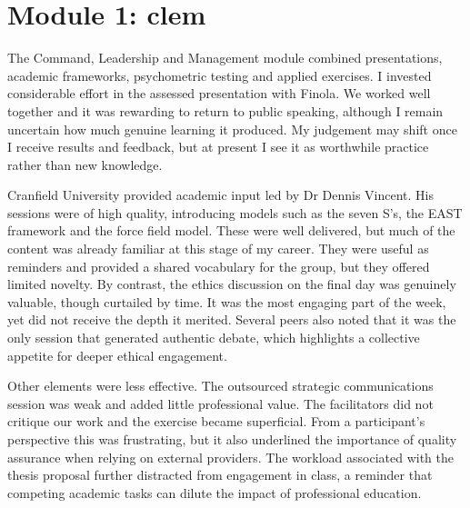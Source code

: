 \chapter{Module 1: \gls{clem}}

The Command, Leadership and Management module combined presentations, academic frameworks, psychometric testing and applied exercises. I invested considerable effort in the assessed presentation with Finola. We worked well together and it was rewarding to return to public speaking, although I remain uncertain how much genuine learning it produced. My judgement may shift once I receive results and feedback, but at present I see it as worthwhile practice rather than new knowledge.  

Cranfield University provided academic input led by Dr Dennis Vincent. His sessions were of high quality, introducing models such as the seven S’s, the EAST framework and the force field model. These were well delivered, but much of the content was already familiar at this stage of my career. They were useful as reminders and provided a shared vocabulary for the group, but they offered limited novelty. By contrast, the ethics discussion on the final day was genuinely valuable, though curtailed by time. It was the most engaging part of the week, yet did not receive the depth it merited. Several peers also noted that it was the only session that generated authentic debate, which highlights a collective appetite for deeper ethical engagement.  

Other elements were less effective. The outsourced strategic communications session was weak and added little professional value. The facilitators did not critique our work and the exercise became superficial. From a participant’s perspective this was frustrating, but it also underlined the importance of quality assurance when relying on external providers. The workload associated with the thesis proposal further distracted from engagement in class, a reminder that competing academic tasks can dilute the impact of professional education.  

